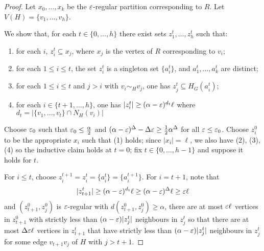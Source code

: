 \documentclass[main.tex]{subfiles}
\begin{document}
\begin{proof}
  Let $x_0,\ldots,x_k$ be the $\varepsilon$-regular partition corresponding to $R$.
  Let $V(H) = \{v_1,\ldots,v_h\}$.

  We show that, for each $t\in\{0,\ldots,h\}$ there exist sets
  $z_1^t,\ldots,z_h^t$ such that:
  \begin{enumerate}[label=(\arabic*)]
    \item for each $i$, $z_i^t\subseteq x_j$, where $x_j$ is the vertex of $R$
      corresponding to $v_i$;

    \item for each $1\leq i\leq t$, the set $z_i^t$ is a singleton set
      $\{a_i^t\}$, and $a_1^t,\ldots,a_k^t$ are distinct;

    \item for each $1\leq i\leq t$ and $j > i$ with $v_i\sim_H v_j$,
      one has $z_j^t\subseteq H_G(a_i^t)$;

    \item for each $i\in\{t+1,\ldots,h\}$, one has
      $|z_i^t|\geq(\alpha-\varepsilon)^{d_t}\ell$
      where $d_t = |\{v_1,\ldots,v_t\}\cap N_H(v_i)|$
  \end{enumerate}

  Choose $\varepsilon_0$ such that $\varepsilon_0\leq\frac{\alpha}{2}$ and
  $(\alpha-\varepsilon)^\Delta-\Delta\varepsilon\geq\frac{1}{2}\alpha^\Delta$ for all $\varepsilon\leq\varepsilon_0$.
  Choose $z_i^0$ to be the appropriate $x_i$ such that (1) holds; since
  $|x_i| = \ell$, we also have (2), (3), (4) so the inductive claim holds at
  $t=0$; fix $t\in\{0,\ldots,h-1\}$ and suppose it holds for $t$.

  For $i\leq t$, choose $z_i^{t+1} = z_i^t = \{a_i^t\} = \{a_i^{t+1}\}$.
  For $i = t+1$, note that
  \[
    |z_{t+1}^t|\geq(\alpha-\varepsilon)^{d_t}\ell\geq(\alpha-\varepsilon)^\Delta\ell\geq\varepsilon\ell
  \]
  and $(z_{t+1}^0,z_j^0)$ is $\varepsilon$-regular with $d(z_{t+1}^0,z_j^0)\geq\alpha$,
  there are at most $\varepsilon\ell$ vertices in $z_{t+1}^0$ with strictly less than
  $(\alpha-\varepsilon)|z_j^t|$ neighbours in $z_j^t$ so that there are at most
  $\Delta\varepsilon\ell$ vertices in $z_{t+1}^t$ that have strictly less than
  $(\alpha-\varepsilon)|z_j^t|$ neighbours in $z_j^t$ for some edge
  $v_{t+1}v_j$ of $H$ with $j > t+1$.


\end{proof}
\end{document}
